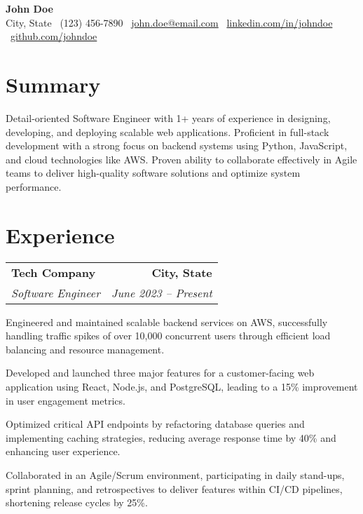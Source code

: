 \documentclass[10pt, letterpaper]{article}
\makeatletter
\newcommand{\resumeheading}[4]{
  \vspace{2pt}
  \item
    \begin{tabular*}{\textwidth}{l@{\extracolsep{\fill}}r}
      \textbf{#1} & \textbf{#2} \\
      \textit{\color{gray}#3} & \textit{\color{gray}#4} \\
    \end{tabular*}
  \vspace{-8pt} %
}
\newcommand{\resumebullet}[1]{\item\small{#1}}
\makeatother
\begin{document}
\begin{center}
    {\Huge\bfseries John Doe} \\ \vspace{4pt}
    \small
    City, State \textbullet\
    (123) 456-7890 \textbullet\
    \href{mailto:john.doe@email.com}{john.doe@email.com} \textbullet\
    \href{https://www.linkedin.com/in/johndoe}{linkedin.com/in/johndoe} \textbullet\
    \href{https://github.com/johndoe}{github.com/johndoe}
\end{center}

\section{Summary}
\vspace{2pt}
\small{Detail-oriented Software Engineer with 1+ years of experience in designing, developing, and deploying scalable web applications. Proficient in full-stack development with a strong focus on backend systems using Python, JavaScript, and cloud technologies like AWS. Proven ability to collaborate effectively in Agile teams to deliver high-quality software solutions and optimize system performance.}

\section{Experience}
\begin{resumelist}
    \resumeheading
      {Tech Company}{City, State}
      {Software Engineer}{June 2023 -- Present}
    \begin{bulletlist}
        \resumebullet{Engineered and maintained scalable backend services on AWS, successfully handling traffic spikes of over 10,000 concurrent users through efficient load balancing and resource management.}
        \resumebullet{Developed and launched three major features for a customer-facing web application using React, Node.js, and PostgreSQL, leading to a 15\% improvement in user engagement metrics.}
        \resumebullet{Optimized critical API endpoints by refactoring database queries and implementing caching strategies, reducing average response time by 40\% and enhancing user experience.}
        \resumebullet{Collaborated in an Agile/Scrum environment, participating in daily stand-ups, sprint planning, and retrospectives to deliver features within CI/CD pipelines, shortening release cycles by 25\%.}
    \end{bulletlist}
\end{resumelist}
\end{document}
